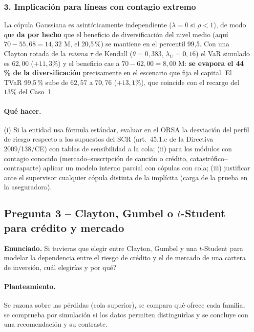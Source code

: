\documentclass[a4paper,12pt]{article}
\newcommand{\euro}{\texteuro}
\begin{document}
\subsubsection*{3. Implicación para líneas con contagio extremo}
La cópula Gaussiana es asintóticamente independiente ($\lambda=0$ si $\rho<1$), de modo que \textbf{da por hecho} que el beneficio de diversificación del nivel medio (aquí $70-55{,}68=14{,}32$ M\euro, el 20,5\,\%) se mantiene en el percentil 99,5. Con una Clayton rotada de la \emph{misma} $\tau$ de Kendall ($\theta=0{,}383$, $\lambda_U=0{,}16$) el VaR simulado es $62{,}00$ ($+11{,}3\%$) y el beneficio cae a $70-62{,}00=8{,}00$ M\euro: \textbf{se evapora el 44\,\% de la diversificación} precisamente en el escenario que fija el capital. El TVaR 99,5\,\% sube de $62{,}57$ a $70{,}76$ ($+13{,}1\%$), que coincide con el recargo del $13\%$ del Caso~1.

\paragraph{Qué hacer.} (i) Si la entidad usa fórmula estándar, evaluar en el ORSA la desviación del perfil de riesgo respecto a los supuestos del SCR (art.~45.1.c de la Directiva 2009/138/CE) con tablas de sensibilidad a la cola; (ii) para los módulos con contagio conocido (mercado--suscripción de caución o crédito, catastrófico--contraparte) aplicar un modelo interno parcial con cópulas con cola; (iii) justificar ante el supervisor cualquier cópula distinta de la implícita (carga de la prueba en la aseguradora).

\subsection{Pregunta 3 -- Clayton, Gumbel o $t$-Student para crédito y mercado}

\noindent\textbf{Enunciado.} Si tuvieras que elegir entre Clayton, Gumbel y una $t$-Student para modelar la dependencia entre el riesgo de crédito y el de mercado de una cartera de inversión, \textquestiondown{}cuál elegirías y por qué?

\paragraph{Planteamiento.} Se razona sobre las pérdidas (cola superior), se compara qué ofrece cada familia, se comprueba por simulación si los datos permiten distinguirlas y se concluye con una recomendación y su contraste.
\end{document}
